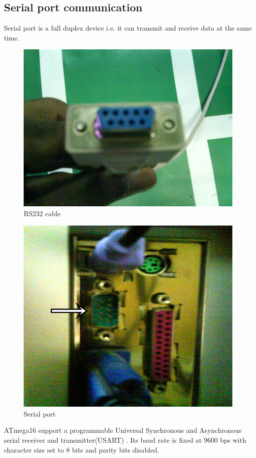 \documentclass[12pt]{report}
\begin{document}
\subsection{Serial port communication}
Serial port is a full duplex device i.e. it can transmit and receive data at the same time.
\begin{figure}
\centering
\includegraphics[width=0.5\linewidth]{RS232cable.jpg}
\caption{RS232 cable}
\end{figure}
\begin{figure}
\centering
\includegraphics[width=0.5\linewidth]{Serialport.jpg}
\caption{Serial port}
\end{figure}
ATmega16 support a programmable Universal Synchronous and Asynchronous serial receiver and transmitter(USART) . Its baud rate is fixed at 9600 bps with character size set to 8 bits and parity bits disabled.
\end{document}
